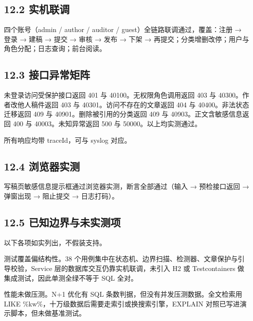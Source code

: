 \documentclass[zihao=-4,UTF8,openany]{ctexart}
\renewcommand{\_}{\textunderscore\allowbreak}
\begin{document}
\subsection*{\texorpdfstring{\textbf{12.2 实机联调}}{12.2 实机联调}}\label{ux5b9eux673aux8054ux8c03}

四个账号（admin / author / auditor / guest）全链路联调通过，覆盖：注册 → 登录 → 建稿 → 提交 → 审核 → 发布 → 下架 → 再提交；分类增删改停；用户与角色分配；日志查询；前台阅读。

\subsection*{\texorpdfstring{\textbf{12.3 接口异常矩阵}}{12.3 接口异常矩阵}}\label{ux63a5ux53e3ux5f02ux5e38ux77e9ux9635}

未登录访问受保护接口返回 401 与 40100。无权限角色调用返回 403 与 40300。作者改他人稿件返回 403 与 40301。访问不存在的文章返回 404 与 40400。非法状态迁移返回 409 与 40901。删除被引用的分类返回 409 与 40903。正文含敏感信息返回 400 与 40003。未知异常返回 500 与 50000。以上均实测通过。

所有响应均带 traceId，可与 sys\_log 对应。

\subsection*{\texorpdfstring{\textbf{12.4 浏览器实测}}{12.4 浏览器实测}}\label{ux6d4fux89c8ux5668ux5b9eux6d4b}

写稿页敏感信息提示框通过浏览器实测，断言全部通过（输入 → 预检接口返回 → 弹窗出现 → 阻止提交 → 日志打码）。

\subsection*{\texorpdfstring{\textbf{12.5 已知边界与未实测项}}{12.5 已知边界与未实测项}}\label{ux5df2ux77e5ux8fb9ux754cux4e0eux672aux5b9eux6d4bux9879}

以下各项如实列出，不假装支持。

测试覆盖偏结构性。38 个用例集中在状态机、边界扫描、检测器、文章保护与引导校验，Service 层的数据库交互仍靠实机联调，未引入 H2 或 Testcontainers 做集成测试，因此单测全绿不等于 SQL 全对。

性能未做压测。N+1 优化有 SQL 条数判据，但没有并发压测数据。全文检索用 LIKE \%kw\%，十万级数据后需要走索引或换搜索引擎，EXPLAIN 对照已写进演示脚本，但未做基准测试。
\end{document}
